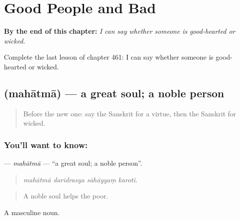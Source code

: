 
\chapter{Good People and Bad}
\label{ch:sa-good-people-and-bad}

\begin{chapteropening}
\textbf{By the end of this chapter:} \emph{I can say whether someone is good-hearted or wicked.}

Complete the last lesson of chapter 461: I can say whether someone is good-hearted or wicked.
\end{chapteropening}

\section[\texorpdfstring{\sk{महात्मा} (mahātmā)}{महात्मा (mahātmā)}]{ (mahātmā) — a great soul; a noble person}

\label{lesson:SA-C461-mahatma}



\begin{quote}
Before the new one: say the Sanskrit for a virtue, then the Sanskrit for wicked.
\end{quote}

\subsection*{You'll want to know: }
\textbf{} — \emph{mahātmā} — \textquotedblleft{}a great soul; a noble person\textquotedblright{}.

\begin{quote}
   
\end{quote}

\begin{quote}
\emph{mahātmā daridrasya sāhāyyaṃ karoti.}
\end{quote}

\begin{quote}
A noble soul helps the poor.
\end{quote}

A masculine noun.

